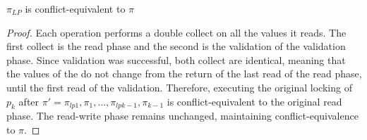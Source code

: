 \begin{lemma}
$\pi_{LP}$ is conflict-equivalent to $\pi$
\end{lemma}
\begin{proof}
Each operation performs a double collect on all the values it reads. 
The first collect is the read phase and the second is the \readSet 
validation of the validation phase. Since validation was successful, 
both collect are identical, meaning that the values of the \readSet
do not change from the return of the last read of the read phase,
until the first read of the \readSet validation. Therefore, executing 
the original locking of $p_k$ after $\pi' =
\pi_{lp1},\pi_{1},\ldots,\pi_{lpk-1},\pi_{k-1}$ is conflict-equivalent
to the original read phase. The read-write phase remains unchanged, 
maintaining conflict-equivalence to $\pi$.
\end{proof}